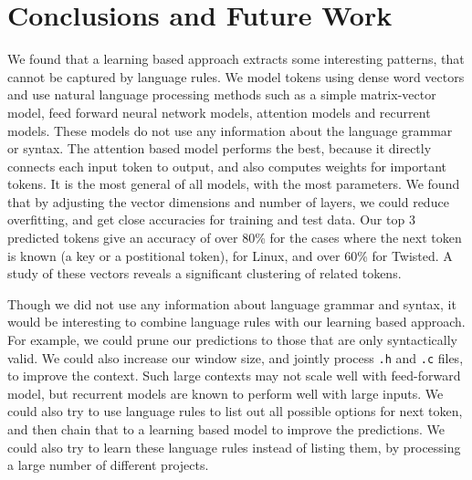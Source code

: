 \section{Conclusions and Future Work}
\label{sec:conclusions}

We found that a learning based approach extracts some interesting patterns,
that cannot be captured by language rules.
We model tokens using dense word vectors and use natural language processing
methods such as 
a simple matrix-vector model, feed forward neural network models,
attention models and recurrent models.
These models do not use any information about the language grammar or syntax.
The attention based model performs the best, because it directly connects each
input token to output, and also computes weights for important tokens. It is
the most general of all models, with the most parameters.
We found that by adjusting the vector dimensions and number of layers, we could
reduce overfitting, and get close accuracies for training and test data.
Our top 3 predicted tokens give an accuracy of over 80\% for the cases where
the next token is known (a key or a postitional token), for Linux,
and over 60\% for Twisted.
A study of these vectors reveals a significant clustering of related tokens.

Though we did not use any information about language grammar and syntax, it
would be interesting to combine language rules with our learning based
approach. For example, we could prune our predictions to those that are only
syntactically valid. We could also increase our window size, and jointly
process \texttt{.h} and \texttt{.c} files, to improve the context. Such large
contexts may not scale well with feed-forward model, but recurrent models are
known to perform well with large inputs. We could also try to use language
rules to list out all possible options for next token, and then chain that to a
learning based model to improve the predictions. We could also try to learn
these language rules instead of listing them, by processing a large number of
different projects.
